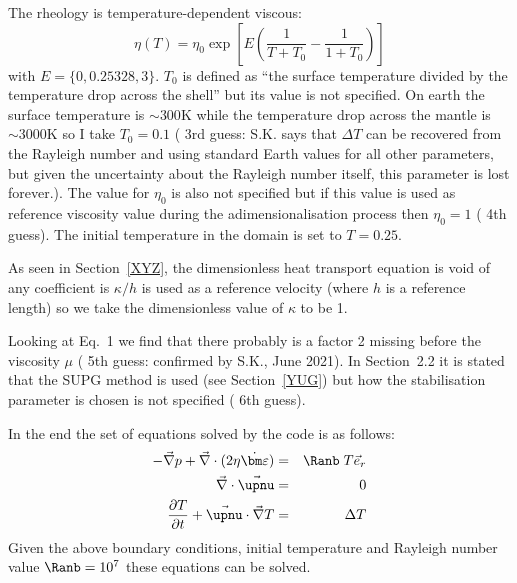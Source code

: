 The rheology is temperature-dependent viscous:
\[
\eta(T) =\eta_0 \exp\left[ E \left( \frac{1}{T+T_0} -\frac{1}{1+T_0}  \right)   \right]
\]
with $E= \{0,0.25328,3\}$. $T_0$ is defined as ``the surface temperature divided by the temperature
drop across the shell'' but its value is not specified. On earth the surface temperature is $\sim300\si{\kelvin}$
while the temperature drop across the mantle is $\sim3000\si{\kelvin}$ 
so I take $T_0=0.1$ ({\color{orange} 3rd guess}: S.K. says that $\Delta T$ can be recovered from the Rayleigh number and using standard Earth values for all other parameters, but given the uncertainty about the Rayleigh number itself, this parameter is lost forever.).
The value for $\eta_0$ is also not specified but if this value is used as reference viscosity value 
during the adimensionalisation process then $\eta_0=1$ ({\color{orange} 4th guess}).
The initial temperature in the domain is set to $T=0.25$.

As seen in Section~\ref{XYZ}, the dimensionless heat transport equation is void of any coefficient is 
$\kappa/h$ is used as a reference velocity (where $h$ is a reference length) so we take the 
dimensionless value of $\kappa$ to be 1.   

Looking at Eq.~1 we find that there probably is a factor 2 missing before 
the viscosity $\mu$ ({\color{orange} 5th guess}: confirmed by S.K., June 2021).
In Section~2.2 it is stated that the SUPG method is used (see Section~\ref{YUG}) but how the stabilisation parameter
is chosen is not specified ({\color{orange} 6th guess}).

In the end the set of equations solved by the code is as follows:
\begin{eqnarray}
-\vec\nabla p + \vec\nabla \cdot(2 \eta \dot{\bm \varepsilon} ) &=& \Ranb \; T \vec{e}_r \\
\vec\nabla\cdot\vec\upnu &=& 0 \\
\frac{\partial T}{\partial t} + \vec\upnu\cdot\vec\nabla T &=& \Delta T 
\end{eqnarray}
Given the above boundary conditions, initial temperature and Rayleigh number value $\Ranb=10^7$ these
equations can be solved. 

